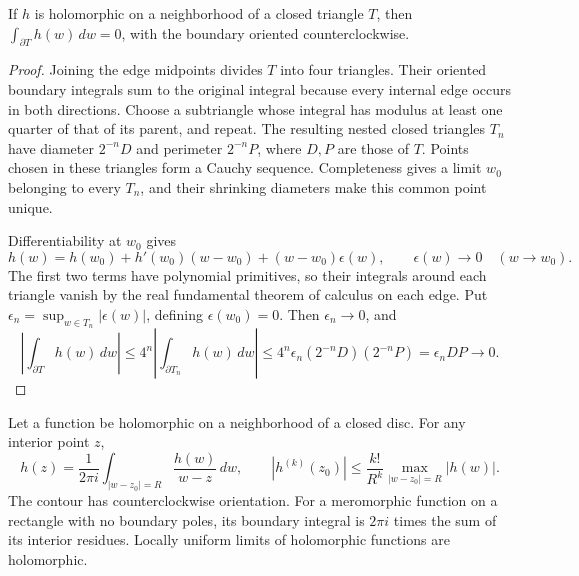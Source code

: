 \begin{lemma}
\label{lem:weil-triangle-integral}
If $h$ is holomorphic on a neighborhood of a closed triangle $T$, then
$\int_{\partial T}h(w)\,dw=0$, with the boundary oriented counterclockwise.
\end{lemma}
\begin{proof}
Joining the edge midpoints divides $T$ into four triangles.
Their oriented boundary integrals sum to the original integral because
every internal edge occurs in both directions.
Choose a subtriangle whose integral has modulus at least one quarter
of that of its parent, and repeat.  The resulting nested closed triangles
$T_n$ have diameter $2^{-n}D$ and perimeter $2^{-n}P$, where $D,P$ are
those of $T$.  Points chosen in these triangles form a Cauchy sequence.
Completeness gives a limit $w_0$ belonging to every $T_n$, and their
shrinking diameters make this common point unique.

Differentiability at $w_0$ gives
\[
 h(w)=h(w_0)+h'(w_0)(w-w_0)+(w-w_0)\epsilon(w),
 \qquad \epsilon(w)\longrightarrow0\quad(w\to w_0).
\]
The first two terms have polynomial primitives, so their integrals around
each triangle vanish by the real fundamental theorem of calculus on each
edge.  Put $\epsilon_n=\sup_{w\in T_n}|\epsilon(w)|$, defining
$\epsilon(w_0)=0$.  Then $\epsilon_n\to0$, and
\[
 \left|\int_{\partial T}h(w)\,dw\right|
 \leq4^n\left|\int_{\partial T_n}h(w)\,dw\right|
 \leq4^n\epsilon_n(2^{-n}D)(2^{-n}P)
 =\epsilon_nDP\longrightarrow0.
\]
\end{proof}

\begin{lemma}
\label{lem:cauchy}
Let a function be holomorphic on a neighborhood of a closed disc.
For any interior point $z$,
\[
 h(z)=\frac1{2\pi i}\int_{|w-z_0|=R}\frac{h(w)}{w-z}\,dw,
 \qquad
 |h^{(k)}(z_0)|\leq \frac{k!}{R^k}\max_{|w-z_0|=R}|h(w)|.
\]
The contour has counterclockwise orientation.
For a meromorphic function on a rectangle with no boundary poles, its
boundary integral is $2\pi i$ times the sum of its interior residues.
Locally uniform limits of holomorphic functions are holomorphic.
\end{lemma}

